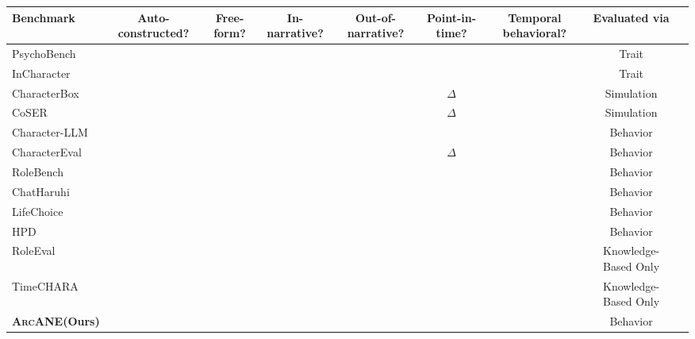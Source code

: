 \documentclass[11pt]{article}
\newcommand{\ours}{\textsc{ArcANE}}
\newcommand{\cmark}{\ding{51}}
\newcommand{\xmark}{\ding{55}}
\begin{document}
{\renewcommand{\arraystretch}{0.95}
\setlength{\tabcolsep}{5pt}
\begin{table}[t!]
\centering
\small
\begin{adjustbox}{width=\textwidth}
\begin{tabular}{lcccccccl}
\toprule
\textbf{Benchmark} & 
\textbf{Auto-constructed?} & 
\textbf{Free-form?} & 
\textbf{In-narrative?} & 
\textbf{Out-of-narrative?} & 
\textbf{Point-in-time?} & 
\textbf{Temporal behavioral?} & 
\textbf{Evaluated via} \\
\midrule
PsychoBench~\cite{huang2024psychobench}    & \xmark & \xmark & \xmark & \xmark & \xmark & \xmark & Trait \\
InCharacter~\cite{wang-etal-2024-incharacter}  & \cmark & \cmark & \xmark & \xmark & \xmark & \xmark & Trait \\
CharacterBox~\cite{wang-etal-2025-characterbox} & \cmark & \cmark & \cmark & \cmark & $\Delta$ & \xmark & Simulation \\
CoSER~\cite{wang2025coser} & \cmark & \cmark & \cmark & \xmark & $\Delta$ & \xmark & Simulation \\
Character-LLM~\cite{shao-etal-2023-characterllm} & \cmark & \cmark & \xmark & \cmark & \xmark & \xmark & Behavior \\
CharacterEval~\cite{tu-etal-2024-charactereval} & \cmark & \cmark & \cmark & \xmark & $\Delta$ & \xmark & Behavior \\
RoleBench~\cite{wang-etal-2024-rolellm}      & \cmark & \cmark & \xmark & \cmark & \xmark & \xmark & Behavior \\
ChatHaruhi~\cite{Li2023chatharuhi}    & \cmark & \cmark & \cmark & \xmark & \xmark & \xmark & Behavior \\
LifeChoice~\cite{xu-etal-2025-characterisdestiny} & \cmark & \xmark & \cmark & \xmark & \cmark & \xmark & Behavior \\
HPD~\cite{chen-etal-2023-hpd}                & \cmark & \cmark & \cmark & \xmark & \cmark & \cmark & Behavior \\
RoleEval~\cite{shen2024roleevalbilingualroleevaluation}      & \xmark & \xmark & \cmark & \xmark & \xmark & \xmark & Knowledge-Based Only \\
TimeCHARA~\cite{ahn-etal-2024-timechara} & \cmark & \cmark & \cmark & \xmark & \cmark & \xmark & Knowledge-Based Only \\
\midrule
\rowcolor{gray!15}
\textbf{\ours (Ours)}             & \cmark & \cmark & \cmark & \cmark & \cmark & \cmark & Behavior \\
\bottomrule

\end{tabular}
\end{adjustbox}
\end{table}}
\end{document}
